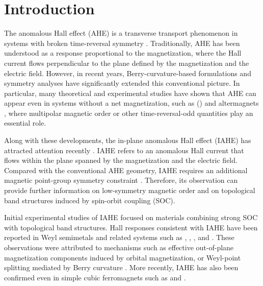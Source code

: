 \documentclass[preprint,12pt]{elsarticle}
\begin{document}
 \section{Introduction}
The anomalous Hall effect (AHE) is a transverse transport phenomenon
in systems with broken time-reversal symmetry \cite{Nagaosa2010-tw,
Xiao2010-zr}.
Traditionally, AHE has
been understood as a response proportional to the magnetization,
where the Hall current flows perpendicular to the plane defined by
the magnetization and the electric field. However, in recent years,
Berry-curvature-based formulations and symmetry analyses have
significantly extended this conventional picture. In particular, many
theoretical and experimental studies have shown that AHE can appear
even in systems without a net magnetization, such as  () \cite{Chen2014-co, Nakatsuji2015-lu, Nayak2016-cm,
  Ikhlas2017-mr, Zhang2017-bq, Yang2017-bq, Suzuki2017-dm, Liu2018-nz,
Zhao2019-oa, Chen2021-ua} and
altermagnets \cite{Naka2020-xi, Smejkal2022-fx, Reichlova2024-uc,
Takagi2024-gu}, where multipolar magnetic order or other
time-reversal-odd quantities play an essential role.

Along with these developments, the in-plane anomalous Hall effect
(IAHE) has attracted attention recently \cite{Liu2007-zs,
  Roman2009-fg, Tan2021-nd,
  Zhou2022-qh, Cao2023-yk, Kurumaji2023-qk,
  Nakamura2024-os, Miao2024-tc, Peng2024-oj, Nishihaya2025-tk, Wang2025-ys,
Liu2025-af}. IAHE
refers to an anomalous
Hall current that flows within the plane spanned by the magnetization
and the electric field. Compared with the conventional AHE geometry,
IAHE requires an additional magnetic point-group symmetry constraint
\cite{Tan2021-nd, Kurumaji2023-qk}. Therefore, its
observation can provide further information on low-symmetry magnetic
order and on topological band structures induced by spin-orbit coupling (SOC).

Initial experimental studies of IAHE focused on materials combining
strong SOC with topological band structures.
Hall responses consistent with IAHE have been reported in Weyl
semimetals and related systems such as 
\cite{Nakamura2024-os}, 
\cite{Miao2024-tc},  \cite{Nishihaya2025-tk}, and
 \cite{Wang2025-ys}.
These observations were attributed to mechanisms such as effective
out-of-plane magnetization
components induced by orbital magnetization, or Weyl-point splitting
mediated by Berry curvature \cite{Nakamura2024-os}. More recently,
IAHE has also been
confirmed even in simple cubic ferromagnets such as  and
 \cite{Peng2024-oj}.
\end{document}
